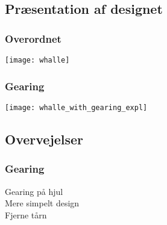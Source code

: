 \subsection{Præsentation af designet}
\begin{frame}
\frametitle{Overordnet}
\begin{center}
\texttt{[image: whalle]}
\end{center}
\end{frame}

\begin{frame}
\frametitle{Gearing}
\begin{center}
\texttt{[image: whalle\_with\_gearing\_expl]}
\end{center}

\end{frame}

\subsection{Overvejelser}
\begin{frame}
\frametitle{Gearing}
Gearing på hjul\\
Mere simpelt design\\
Fjerne tårn
\end{frame}


